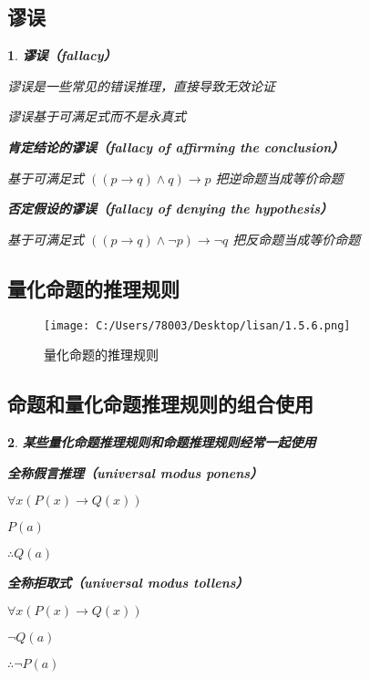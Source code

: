 \documentclass[UTF8]{report}
\theoremstyle{MyLineTheoremStyle} %
\theoremstyle{MyBlockTheoremStyle} %
\theoremstyle{MySubsubsectionStyle} %
\newtheorem{definition}{}
\begin{document}
\subsection{谬误}

\begin{definition}
    \textbf{谬误（fallacy）}\par
    谬误是一些常见的错误推理，直接导致无效论证\par
    谬误基于可满足式而不是永真式\par
    
    \textbf{肯定结论的谬误（fallacy of affirming the conclusion）}\par
    基于可满足式 $((p \rightarrow q) \land q) \rightarrow p$ 把逆命题当成等价命题\par
    
    \textbf{否定假设的谬误（fallacy of denying the hypothesis）}\par
    基于可满足式 $((p \rightarrow q )\land \neg p) \rightarrow \neg q$ 把反命题当成等价命题\par
\end{definition}

\subsection{量化命题的推理规则}

\begin{figure}[ht]
\centering
\texttt{[image: C:/Users/78003/Desktop/lisan/1.5.6.png]}
\caption{量化命题的推理规则}
\end{figure}

\subsection{命题和量化命题推理规则的组合使用}

\begin{definition}
    \textbf{某些量化命题推理规则和命题推理规则经常一起使用}\par

    \textbf{全称假言推理（universal modus ponens）}\par
    $\forall x (P(x) \rightarrow Q(x))$\par
    $P(a)$\par
    $ \therefore Q(a)$\par

    \textbf{全称拒取式（universal modus tollens）}\par
    $\forall x (P(x) \rightarrow Q(x))$\par
    $\neg Q(a)$\par
    $ \therefore \neg P(a)$\par
\end{definition}
\end{document}
